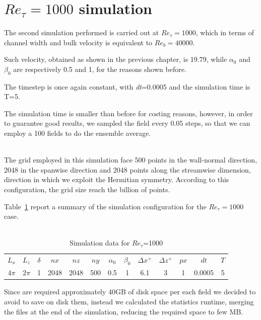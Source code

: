 \section{$Re_{\tau}=1000$ simulation} 
The second simulation performed is carried out at $Re_{\tau}=1000$, which in terms of channel width and bulk velocity is equivalent to $Re_{b}=40000$.\par
Such velocity, obtained as shown in the previous chapter, is 19.79, while $\alpha_{0}$ and $\beta_{0}$ are respectively 0.5 and 1, for the reasons shown before.\par
The timestep is once again constant, with \emph{dt}=0.0005 and the simulation time is T=5. \par
The simulation time is smaller than before for costing reasons, however, in order to guarantee good results, we sampled the field every 0.05 steps, so that we can employ a 100 fields to do the ensemble average.\\~\par
The grid employed in this simulation face 500 points in the wall-normal direction, 2048 in the spanwise direction and 2048 points along the streamwise dimension, direction in which we exploit the Hermitian symmetry. According to this configuration, the grid size reach the billion of points.\par
Table~\ref{table:1000} report a summary of the simulation configuration for the $Re_{\tau}=1000$ case.\\~\par

\begin{table}
\caption{Simulation data for $Re_{\tau}$=1000}
\begin{center}
\begin{tabular}{ccccccccccccc}
\toprule
$L_{x}$ & $L_{z}$ & $\delta$ & $nx$ & $nz$ & $ny$ & $\alpha_{0}$ & $\beta_{0}$ & $\Delta x^{+}$ & $\Delta z^{+}$ & $px$ & $dt$ & $T$\\
$4\pi$ & $2\pi$ & 1 & 2048 & 2048 & 500 & 0.5 & 1 & 6.1  & 3 & 1 & 0.0005 & 5 \\
\bottomrule
\end{tabular}
\end{center}
\label{table:1000}
\end{table}


Since are required approximately 40GB of disk space per each field we decided to avoid to save on disk them, instead we calculated the statistics runtime, merging the files at the end of the simulation, reducing the required space to few MB.\\~\par

